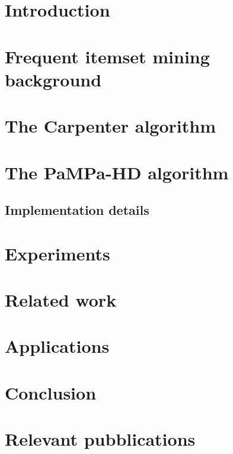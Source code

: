 
\section{Introduction}
\label{Introduction}



\section{Frequent itemset mining background}
\label{Preliminaries}



\section{The Carpenter algorithm}
\label{Carpenter algorithm}



\section{The PaMPa-HD algorithm}
\label{Distributed implementation outline}




\subsection{Implementation details}
\label{MapReduce Carpenter}

%
%


\section{Experiments}
\label{Experiments}




\section{Related work}
\label{Related work}



\section{Applications}
\label{Applications}



\section{Conclusion} \label{Conclusion}


\section{Relevant pubblications}
